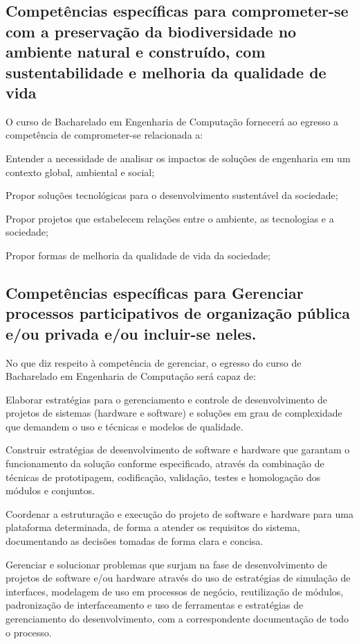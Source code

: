 \subsection*{Competências específicas para comprometer-se com a preservação da biodiversidade no ambiente natural e construído, com sustentabilidade e melhoria da qualidade de vida}

O curso de Bacharelado em Engenharia de Computação fornecerá ao egresso a competência de comprometer-se relacionada a:

\begin{compitem}
    \item Entender a necessidade de analisar os impactos de soluções de engenharia em um contexto global, ambiental e social;%
    \item Propor soluções tecnológicas para o desenvolvimento sustentável da sociedade; %
    \item Propor projetos que estabelecem relações entre o ambiente, as tecnologias e a sociedade;
    \item Propor formas de melhoria da qualidade de vida da sociedade;
\end{compitem}

\subsection*{Competências específicas para Gerenciar processos participativos de organização pública e/ou privada e/ou incluir-se neles.}

No que diz respeito à competência de gerenciar, o egresso do curso de Bacharelado em Engenharia de Computação será capaz de:

\begin{compitem}
    \item Elaborar estratégias para o gerenciamento e controle de desenvolvimento de projetos de sistemas (hardware e software) e soluções em grau de complexidade que demandem o uso e técnicas e modelos de qualidade.
    \item Construir estratégias de desenvolvimento de software e hardware que garantam o funcionamento da solução conforme especificado, através da combinação de técnicas de prototipagem, codificação, validação, testes e homologação dos módulos e conjuntos.
    \item Coordenar a estruturação e execução do projeto de software e hardware para uma plataforma determinada, de forma a atender os requisitos do sistema, documentando as decisões tomadas de forma clara e concisa.
    \item Gerenciar e solucionar problemas que surjam na fase de desenvolvimento de projetos de software e/ou hardware através do uso de estratégias de simulação de interfaces, modelagem de uso em processos de negócio, reutilização de módulos, padronização de interfaceamento e uso de ferramentas e estratégias de gerenciamento do desenvolvimento, com a correspondente documentação de todo o processo.
\end{compitem}


